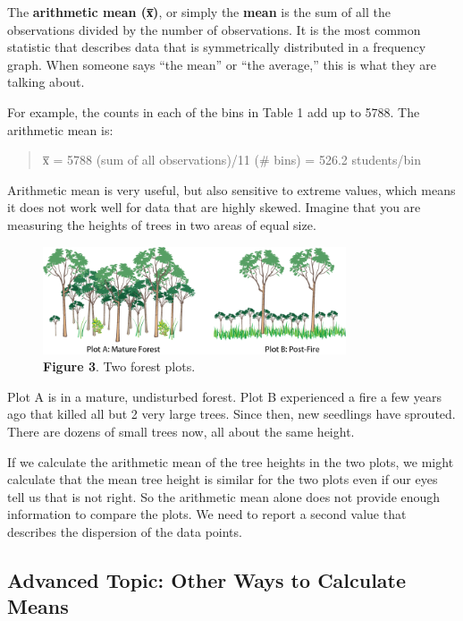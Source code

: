 \documentclass[
]{book}
\begin{document}
The \textbf{arithmetic mean (x̅)}, or simply the \textbf{mean} is the sum of all the observations divided by the number of observations. It is the most common statistic that describes data that is symmetrically distributed in a frequency graph. When someone says ``the mean'' or ``the average,'' this is what they are talking about.

For example, the counts in each of the bins in Table 1 add up to 5788. The arithmetic mean is:

\begin{quote}
x̅ = 5788 (sum of all observations)/11 (\# bins) = 526.2 students/bin
\end{quote}

Arithmetic mean is very useful, but also sensitive to extreme values, which means it does not work well for data that are highly skewed. Imagine that you are measuring the heights of trees in two areas of equal size.

\begin{figure}
\centering
\includegraphics[width=0.8\textwidth,height=\textheight]{images/Tree-plots.png}
\caption{\textbf{Figure 3}. Two forest plots.}
\end{figure}

Plot A is in a mature, undisturbed forest. Plot B experienced a fire a few years ago that killed all but 2 very large trees. Since then, new seedlings have sprouted. There are dozens of small trees now, all about the same height.

If we calculate the arithmetic mean of the tree heights in the two plots, we might calculate that the mean tree height is similar for the two plots even if our eyes tell us that is not right. So the arithmetic mean alone does not provide enough information to compare the plots. We need to report a second value that describes the dispersion of the data points.

\hypertarget{advanced-topic-other-ways-to-calculate-means}{%
\subsection{Advanced Topic: Other Ways to Calculate Means}\label{advanced-topic-other-ways-to-calculate-means}}
\end{document}
